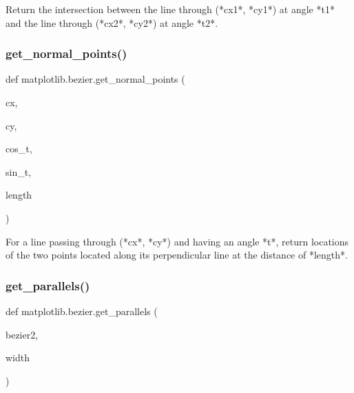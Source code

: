 \begin{DoxyVerb}Return the intersection between the line through (*cx1*, *cy1*) at angle
*t1* and the line through (*cx2*, *cy2*) at angle *t2*.
\end{DoxyVerb}
 \mbox{\label{namespacematplotlib_1_1bezier_a83750c875dd90814c60ff780e32224de}} 
\subsubsection{\texorpdfstring{get\+\_\+normal\+\_\+points()}{get\_normal\_points()}}
{\footnotesize\ttfamily def matplotlib.\+bezier.\+get\+\_\+normal\+\_\+points (\begin{DoxyParamCaption}\item[{}]{cx,  }\item[{}]{cy,  }\item[{}]{cos\+\_\+t,  }\item[{}]{sin\+\_\+t,  }\item[{}]{length }\end{DoxyParamCaption})}

\begin{DoxyVerb}For a line passing through (*cx*, *cy*) and having an angle *t*, return
locations of the two points located along its perpendicular line at the
distance of *length*.
\end{DoxyVerb}
 \mbox{\label{namespacematplotlib_1_1bezier_adb87525c6baca583ac76341c2cc20308}} 
\subsubsection{\texorpdfstring{get\+\_\+parallels()}{get\_parallels()}}
{\footnotesize\ttfamily def matplotlib.\+bezier.\+get\+\_\+parallels (\begin{DoxyParamCaption}\item[{}]{bezier2,  }\item[{}]{width }\end{DoxyParamCaption})}


